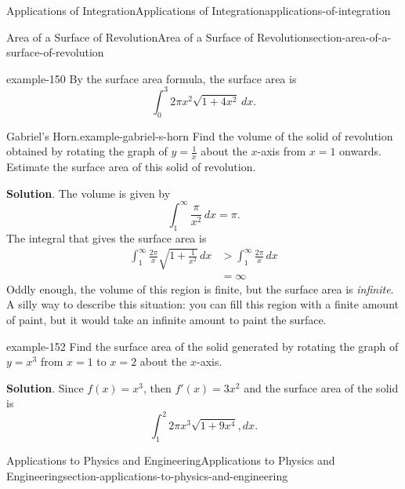 \documentclass[oneside,10pt,]{book}
\numberwithin{equation}{section}
\newcommand{\gt}{>}
\newcommand{\amp}{&}
\begin{document}
\begin{chapterptx}{Applications of Integration}{}{Applications of Integration}{}{}{applications-of-integration}
\begin{sectionptx}{Area of a Surface of Revolution}{}{Area of a Surface of Revolution}{}{}{section-area-of-a-surface-of-revolution}
\begin{example}{}{example-150}
\hypertarget{p-670}{}%
By the surface area formula, the surface area is%
\begin{equation*}
\int_{0}^{3}2 \pi x^{2} \sqrt{1+4x^{2}}\,dx.
\end{equation*}
%
\end{example}
\begin{example}{Gabriel's Horn.}{example-gabriel-s-horn}%
\hypertarget{p-671}{}%
Find the volume of the solid of revolution obtained by rotating the graph of \(y = \frac{1}{x}\) about the \(x\)-axis from \(x = 1\) onwards. Estimate the surface area of this solid of revolution.%
\par\smallskip%
\noindent\textbf{Solution}.\hypertarget{solution-147}{}\quad%
\hypertarget{p-672}{}%
The volume is given by%
\begin{equation*}
\int_{1}^{\infty}\frac{\pi}{x^{2}}\,dx = \pi\text{.}
\end{equation*}
The integral that gives the surface area is%
%
\begin{align*}
\int_{1}^{\infty}\frac{2\pi}{x}\sqrt{1 + \frac{1}{x^{2}}}\,dx \amp \gt \int_{1}^{\infty}\frac{2\pi}{x}\,dx \\
\amp = \infty 
\end{align*}
\hypertarget{p-673}{}%
Oddly enough, the volume of this region is finite, but the surface area is \emph{infinite}. A silly way to describe this situation: you can fill this region with a finite amount of paint, but it would take an infinite amount to paint the surface.%
\end{example}
\begin{example}{}{example-152}%
\hypertarget{p-674}{}%
Find the surface area of the solid generated by rotating the graph of \(y=x^{3}\) from \(x=1\) to \(x=2\) about the \(x\)-axis.%
\par\smallskip%
\noindent\textbf{Solution}.\hypertarget{solution-148}{}\quad%
\hypertarget{p-675}{}%
Since \(f(x)=x^{3}\), then \(f'(x)=3x^{2}\) and the surface area of the solid is%
\begin{equation*}
\int_{1}^{2}2\pi x^{3}\sqrt{1+9x^{4}},dx.
\end{equation*}
%
\end{example}
\end{sectionptx}
%
%
\typeout{************************************************}
\typeout{************************************************}
%
\begin{sectionptx}{Applications to Physics and Engineering}{}{Applications to Physics and Engineering}{}{}{section-applications-to-physics-and-engineering}

\end{sectionptx}
\end{chapterptx}
\end{document}
